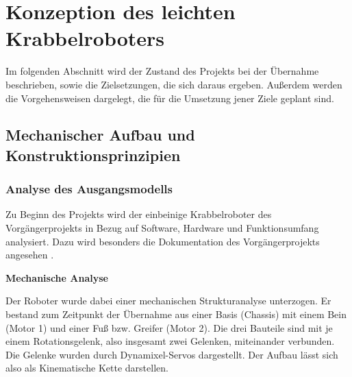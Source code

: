 \section{Konzeption des leichten Krabbelroboters}
\label{sec:konzeption}

Im folgenden Abschnitt wird der Zustand des Projekts bei der Übernahme beschrieben, sowie die Zielsetzungen, die sich daraus ergeben. Außerdem werden die Vorgehensweisen dargelegt, die für die Umsetzung jener Ziele geplant sind.

\subsection{Mechanischer Aufbau und Konstruktionsprinzipien}

\subsubsection{Analyse des Ausgangsmodells}

Zu Beginn des Projekts wird der einbeinige Krabbelroboter des Vorgängerprojekts in Bezug auf Software, Hardware und Funktionsumfang analysiert. Dazu wird besonders die Dokumentation des Vorgängerprojekts angesehen \cite{vorgängerprojekt}.

\textbf{Mechanische Analyse}

Der Roboter wurde dabei einer mechanischen Strukturanalyse unterzogen. Er bestand zum Zeitpunkt der Übernahme aus einer Basis (Chassis) mit einem Bein (Motor 1) und einer Fuß bzw. Greifer (Motor 2). Die drei Bauteile sind mit je einem Rotationsgelenk, also insgesamt zwei Gelenken, miteinander verbunden. Die Gelenke wurden durch Dynamixel-Servos dargestellt. Der Aufbau lässt sich also als Kinematische Kette darstellen.


